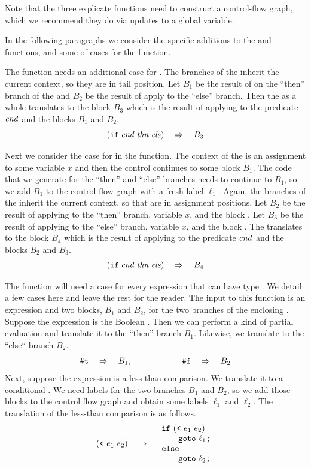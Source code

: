 \documentclass[11pt]{book}
\begin{document}
Note that the three explicate functions need to construct a
control-flow graph, which we recommend they do via updates to a global
variable.

In the following paragraphs we consider the specific additions to the
 and  functions, and some
of cases for the  function.

The  function needs an additional case for
. The branches of the  inherit the current context, so
they are in tail position.  Let $B_1$ be the result of
 on the ``then'' branch of the  and $B_2$
be the result of apply  to the ``else''
branch. Then the  as a whole translates to the block $B_3$
which is the result of applying  to the predicate
$\mathit{cnd}$ and the blocks $B_1$ and $B_2$.
\[
    (\texttt{if}\; \mathit{cnd}\; \mathit{thn}\; \mathit{els}) \quad\Rightarrow\quad B_3
\]

Next we consider the case for  in the 
function. The context of the  is an assignment to some
variable $x$ and then the control continues to some block $B_1$.  The
code that we generate for the ``then'' and ``else'' branches needs to
continue to $B_1$, so we add $B_1$ to the control flow graph with a
fresh label $\ell_1$.  Again, the branches of the  inherit the
current context, so that are in assignment positions.  Let $B_2$ be
the result of applying  to the ``then'' branch,
variable $x$, and the block .  Let $B_3$ be the result
of applying  to the ``else'' branch, variable
$x$, and the block . The  translates to the
block $B_4$ which is the result of applying  to
the predicate $\mathit{cnd}$ and the blocks $B_2$ and $B_3$.
\[
(\texttt{if}\; \mathit{cnd}\; \mathit{thn}\; \mathit{els}) \quad\Rightarrow\quad B_4
\]

The function  will need a case for every
expression that can have type . We detail a few cases
here and leave the rest for the reader. The input to this function is
an expression and two blocks, $B_1$ and $B_2$, for the two branches of
the enclosing . Suppose the expression is the Boolean
.  Then we can perform a kind of partial evaluation and
translate it to the ``then'' branch $B_1$. Likewise, we translate
 to the ``else`` branch $B_2$.
\[
\texttt{\#t} \quad\Rightarrow\quad B_1,
\qquad\qquad\qquad
\texttt{\#f} \quad\Rightarrow\quad B_2
\]
Next, suppose the expression is a less-than comparison. We translate
it to a conditional . We need labels for the two branches
$B_1$ and $B_2$, so we add those blocks to the control flow graph and
obtain some labels $\ell_1$ and $\ell_2$. The translation of the
less-than comparison is as follows.
\[
(\texttt{<}~e_1~e_2) \quad\Rightarrow\quad
\begin{array}{l}
\texttt{if}~(\texttt{<}~e_1~e_2) \\
\qquad\texttt{goto}~\ell_1\texttt{;}\\
\texttt{else}\\
\qquad\texttt{goto}~\ell_2\texttt{;}
\end{array}
\]
\end{document}
